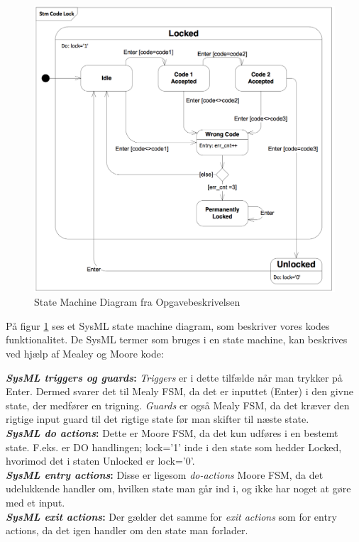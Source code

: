 \begin{enumerate}
\begin{figure}[h!]
	\centering
	\includegraphics[scale=0.6
]{pictures/Oevelse7/opg2/StateMachineDiagram.JPG}
	\caption{State Machine Diagram fra Opgavebeskrivelsen}
	\label{fig:StateMachineDiagram}
\end{figure}

På figur \ref{fig:StateMachineDiagram} ses et SysML state machine diagram, som beskriver vores kodes funktionalitet. De SysML termer som bruges i en state machine, kan beskrives ved hjælp af Mealey og Moore kode:

\textbf{\textit{SysML triggers og guards}:} \textit{Triggers} er i dette tilfælde når man trykker på Enter. Dermed svarer det til Mealy FSM, da det er inputtet (Enter) i den givne state, der medfører en trigning. \textit{Guards} er også Mealy FSM, da det kræver den rigtige input guard til det rigtige state før man skifter til næste state. 
\\\textbf{\textit{SysML do actions}:} Dette er Moore FSM, da det kun udføres i en bestemt state. F.eks. er DO handlingen; lock='1' inde i den state som hedder Locked, hvorimod det i staten Unlocked er lock='0'.
\\\textbf{\textit{SysML entry actions}:} Disse er ligesom \textit{do-actions} Moore FSM, da det udelukkende handler om, hvilken state man går ind i, og ikke har noget at gøre med et input.
\\\textbf{\textit{SysML exit actions}: }Der gælder det samme for \textit{exit actions} som for entry actions, da det igen handler om den state man forlader.


\end{enumerate}
